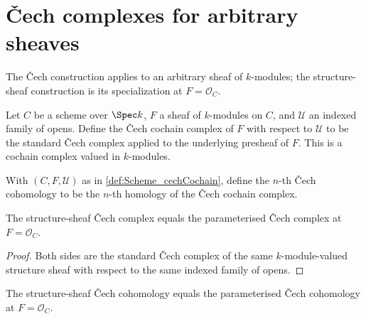 \section{\v{C}ech complexes for arbitrary sheaves}
\label{sec:moduleK_cech_parameterised}

The \v{C}ech construction applies to an arbitrary sheaf of \(k\)-modules; the structure-sheaf construction is its specialization at \(F=\mathcal O_C\).

\begin{definition}\leanok
  \label{def:Scheme_cechCochain}

  Let \(C\) be a scheme over \(\Spec k\), \(F\) a sheaf of \(k\)-modules on \(C\), and \(\mathcal U\) an indexed family of opens. Define the \v{C}ech cochain complex of \(F\) with respect to \(\mathcal U\) to be the standard \v{C}ech complex applied to the underlying presheaf of \(F\). This is a cochain complex valued in \(k\)-modules.
\end{definition}

\begin{definition}\leanok
  \label{def:Scheme_cechCohomology}
  With \((C, F, \mathcal U)\) as in \cref{def:Scheme_cechCochain}, define the \(n\)-th \v{C}ech cohomology to be the \(n\)-th homology of the \v{C}ech cochain complex.
\end{definition}

\begin{theorem}\leanok
  \label{thm:Scheme_cechCochain_OC_eq}
  The structure-sheaf \v{C}ech complex equals the parameterised \v{C}ech complex at \(F = \mathcal O_C\).
\end{theorem}

\begin{proof}
  \leanok
  Both sides are the standard \v{C}ech complex of the same \(k\)-module-valued structure sheaf with respect to the same indexed family of opens.
\end{proof}

\begin{theorem}\leanok
  \label{thm:Scheme_cechCohomology_OC_eq}
  The structure-sheaf \v{C}ech cohomology equals the parameterised \v{C}ech cohomology at \(F = \mathcal O_C\).
\end{theorem}

